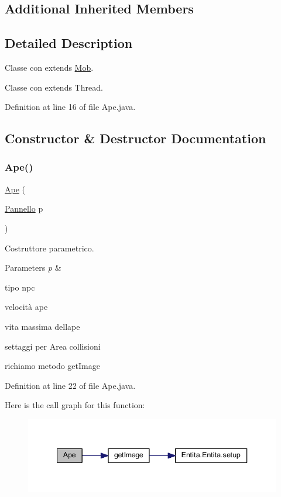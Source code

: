 \subsection*{Additional Inherited Members}


\subsection{Detailed Description}
Classe con extends \hyperlink{class_entita_1_1_mob}{Mob}. 

Classe con extends Thread. 

Definition at line 16 of file Ape.\+java.



\subsection{Constructor \& Destructor Documentation}
\mbox{\label{class_entita_1_1_ape_a5c67298368c58376888777816ca421d4}} 
\subsubsection{\texorpdfstring{Ape()}{Ape()}}
{\footnotesize\ttfamily \hyperlink{class_entita_1_1_ape}{Ape} (\begin{DoxyParamCaption}\item[{\hyperlink{classa_1_1survival_1_1game_1_1_pannello}{Pannello}}]{p }\end{DoxyParamCaption})}



Costruttore parametrico. 


\begin{DoxyParams}{Parameters}
{\em p} & \\
\hline
\end{DoxyParams}
tipo npc

velocità ape

vita massima dell\textquotesingle{}ape

settaggi per Area collisioni

richiamo metodo get\+Image 

Definition at line 22 of file Ape.\+java.

Here is the call graph for this function\+:
\nopagebreak
\begin{figure}[H]
\begin{center}
\leavevmode
\includegraphics[width=340pt]{class_entita_1_1_ape_a5c67298368c58376888777816ca421d4_cgraph}
\end{center}
\end{figure}



